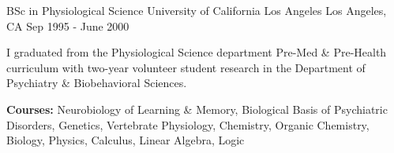 \begin{cventries}
  \cventry
    {BSc in Physiological Science} %
    {University of California Los Angeles} %
    {Los Angeles, CA} %
    {Sep 1995 - June 2000} %
    {
      \begin{cvitems} %
        \item {I graduated from the Physiological Science department Pre-Med \& Pre-Health curriculum with two-year volunteer student research in the Department of Psychiatry \& Biobehavioral Sciences.}
        \item {\textbf{Courses:} Neurobiology of Learning \& Memory, Biological Basis of Psychiatric Disorders, Genetics, Vertebrate Physiology, Chemistry, Organic Chemistry, Biology, Physics, Calculus, Linear Algebra, Logic}
      \end{cvitems}
    }
\end{cventries}
